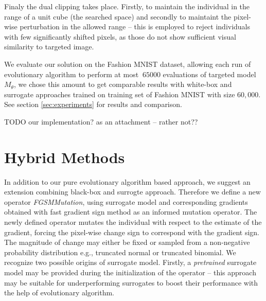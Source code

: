 Finaly the dual clipping takes place. Firstly, to maintain the individual in the range of a unit cube (the searched space) and secondly to maintaint the pixel-wise perturbation in the allowed range -- this is employed to reject individuals with few significantly shifted pixels, as those do not show sufficient visual similarity to targeted image.

We evaluate our solution on the Fashion MNIST dataset, allowing each run of evolutionary algorithm to perform at most $~65000$ evaluations of targeted model $M_\theta$, we chose this amount to get comparable results with white-box and surrogate approaches trained on training set of Fashion MNIST with size $60,000$. See section \ref{sec:experiments} for results and comparison.

TODO our implementation? as an attachment -- rather not??

\section{Hybrid Methods}
In addition to our pure evolutionary algorithm based approach, we suggest an extension combining black-box and surrogte approach. Therefore we define a new operator \emph{FGSMMutation}, using surrogate model and corresponding gradients obtained with fast gradient sign method as an informed mutation operator.
The newly defined operator mutates the individual with respect to the estimate of the gradient, forcing the pixel-wise change sign to correspond with the gradient sign. The magnitude of change may either be fixed or sampled from a non-negative probability distribution e.g., truncated normal or truncated binomial. We recognize two possible origins of surrogate model. Firstly, a \emph{pretrained} surrogate model may be provided during the initialization of the operator -- this approach may be suitable for underperforming surrogates to boost their performance with the help of evolutionary algorithm. 

